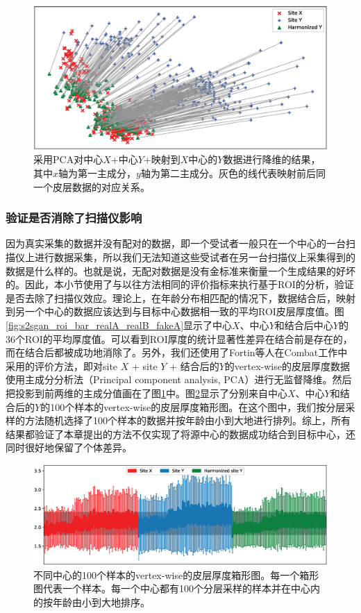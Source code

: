 \begin{figure}[t]
\centering
\includegraphics[width=\linewidth]{figure/s2sgan_pca.eps}
\caption{采用PCA对中心$X$+中心$Y$+映射到$X$中心的$Y$数据进行降维的结果，其中$x$轴为第一主成分，$y$轴为第二主成分。灰色的线代表映射前后同一个皮层数据的对应关系。}\label{fig:s2sgan_pca} 
\end{figure} 

\subsubsection{验证是否消除了扫描仪影响}
因为真实采集的数据并没有配对的数据，即一个受试者一般只在一个中心的一台扫描仪上进行数据采集，所以我们无法知道这些受试者在另一台扫描仪上采集得到的数据是什么样的。也就是说，无配对数据是没有金标准来衡量一个生成结果的好坏的。因此，本小节使用了与以往方法\cite{karayumak2019retrospective}相同的评价指标来执行基于ROI的分析，验证是否去除了扫描仪效应。理论上，在年龄分布相匹配的情况下，数据结合后，映射到另一个中心的数据应该达到与目标中心数据相一致的平均ROI皮层厚度值。图\ref{fig:s2sgan_roi_bar_realA_realB_fakeA}显示了中心$X$、中心$Y$和结合后中心$Y$的36个ROI的平均厚度值。可以看到ROI厚度的统计显著性差异在结合前是存在的，而在结合后都被成功地消除了。另外，我们还使用了Fortin等人在Combat\cite{fortin2018harmonization}工作中采用的评价方法，即对site $X$ + site $Y$ + 结合后的$Y$的vertex-wise的皮层厚度数据使用主成分分析法（Principal component analysis, PCA）进行无监督降维。然后把投影到前两维的主成分值画在了图\ref{fig:s2sgan_pca}中。图\ref{fig:s2sgan_boxplot}显示了分别来自中心$X$、中心$Y$和结合后的$Y$的100个样本的vertex-wise的皮层厚度箱形图。在这个图中，我们按分层采样的方法随机选择了100个样本的数据并按年龄由小到大地进行排列。综上，所有结果都验证了本章提出的方法不仅实现了将源中心的数据成功结合到目标中心，还同时很好地保留了个体差异。

\begin{figure}[t]
\centering
\includegraphics[width=\textwidth]{figure/s2sgan_boxplot.eps}
\caption{不同中心的100个样本的vertex-wise的皮层厚度箱形图。每一个箱形图代表一个样本。每一个中心都有100个分层采样的样本并在中心内的按年龄由小到大地排序。}\label{fig:s2sgan_boxplot} 
\end{figure} 

